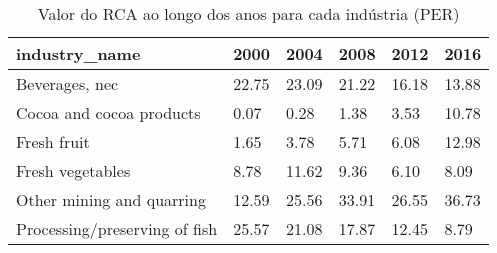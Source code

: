 \begin{table}
\centering
\caption{Valor do RCA ao longo dos anos para cada indústria (PER)}
\begin{tabular}{p{6cm}p{1.5cm}p{1.5cm}p{1.5cm}p{1.5cm}p{1.5cm}}
\toprule
                industry\_name &  2000 &  2004 &  2008 &  2012 &  2016 \\
\midrule
               Beverages, nec & 22.75 & 23.09 & 21.22 & 16.18 & 13.88 \\
     Cocoa and cocoa products &  0.07 &  0.28 &  1.38 &  3.53 & 10.78 \\
                  Fresh fruit &  1.65 &  3.78 &  5.71 &  6.08 & 12.98 \\
             Fresh vegetables &  8.78 & 11.62 &  9.36 &  6.10 &  8.09 \\
    Other mining and quarring & 12.59 & 25.56 & 33.91 & 26.55 & 36.73 \\
Processing/preserving of fish & 25.57 & 21.08 & 17.87 & 12.45 &  8.79 \\
\bottomrule
\end{tabular}
\end{table}
